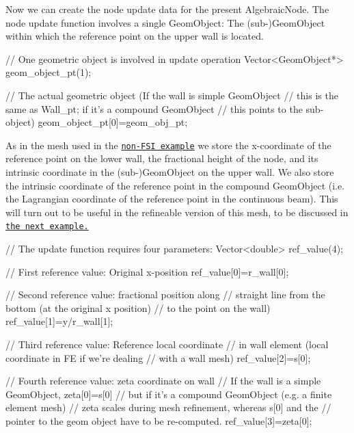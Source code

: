 Now we can create the node update data for the present {\ttfamily Algebraic\+Node}. The node update function involves a single {\ttfamily Geom\+Object\+:} The (sub-\/){\ttfamily Geom\+Object} within which the reference point on the upper wall is located.


\begin{DoxyCodeInclude}
     


     \textcolor{comment}{// One geometric object is involved in update operation}
     Vector<GeomObject*> geom\_object\_pt(1);

     \textcolor{comment}{// The actual geometric object (If the wall is simple GeomObject}
     \textcolor{comment}{// this is the same as Wall\_pt; if it's a compound GeomObject}
     \textcolor{comment}{// this points to the sub-object)}
     geom\_object\_pt[0]=geom\_obj\_pt;

\end{DoxyCodeInclude}


As in the mesh used in the \href{../../../navier_stokes/algebraic_collapsible_channel/html/index.html}{\tt non-\/\+F\+SI example} we store the x-\/coordinate of the reference point on the lower wall, the fractional height of the node, and its intrinsic coordinate in the (sub-\/){\ttfamily Geom\+Object} on the upper wall. We also store the intrinsic coordinate of the reference point in the compound {\ttfamily Geom\+Object} (i.\+e. the Lagrangian coordinate of the reference point in the continuous beam). This will turn out to be useful in the refineable version of this mesh, to be discussed in \href{../../fsi_collapsible_channel_adapt/html/index.html}{\tt the next example.}


\begin{DoxyCodeInclude}

     \textcolor{comment}{// The update function requires four  parameters:}
     Vector<double> ref\_value(4);
     
     \textcolor{comment}{// First reference value: Original x-position }
     ref\_value[0]=r\_wall[0];
     
     \textcolor{comment}{// Second  reference value: fractional position along }
     \textcolor{comment}{// straight line from the bottom (at the original x position)}
     \textcolor{comment}{// to the point on the wall)}
     ref\_value[1]=y/r\_wall[1];
     
     \textcolor{comment}{// Third reference value: Reference local coordinate}
     \textcolor{comment}{// in wall element (local coordinate in FE if we're dealing}
     \textcolor{comment}{// with a wall mesh)}
     ref\_value[2]=s[0];   

     \textcolor{comment}{// Fourth reference value: zeta coordinate on wall}
     \textcolor{comment}{// If the wall is a simple GeomObject, zeta[0]=s[0]}
     \textcolor{comment}{// but if it's a compound GeomObject (e.g. a finite element mesh)}
     \textcolor{comment}{// zeta scales during mesh refinement, whereas s[0] and the}
     \textcolor{comment}{// pointer to the geom object have to be re-computed.}
     ref\_value[3]=zeta[0];     

\end{DoxyCodeInclude}



